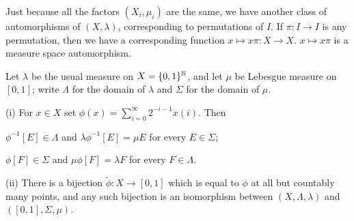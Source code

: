 
Just because all the factors $(X_i,\mu_i)$ are the same, we
have another class of automorphisms of $(X,\lambda)$, corresponding to
permutations of $I$.   If $\pi:I\to I$ is any permutation, then
we have a corresponding function $x\mapsto x\pi:X\to X$.    $x\mapsto x\pi$ is a measure
space automorphism.

 Let $\lambda$ be the usual measure on
$X=\{0,1\}^{\Bbb N}$, and let $\mu$ be Lebesgue measure on $[0,1]$;
write $\Lambda$ for the domain of $\lambda$ and $\Sigma$ for the domain
of $\mu$.

(i) For $x\in X$ set $\phi(x)=\sum_{i=0}^{\infty}2^{-i-1}x(i)$.   Then

\qquad $\phi^{-1}[E]\in\Lambda$ and $\lambda\phi^{-1}[E]=\mu E$
for every $E\in\Sigma$;

\qquad $\phi[F]\in\Sigma$ and $\mu\phi[F]=\lambda F$ for
every $F\in\Lambda$.

(ii) There is a bijection $\tilde\phi:X\to[0,1]$ which is equal to
$\phi$ at all but countably many points, and any such bijection is an
isomorphism between $(X,\Lambda,\lambda)$ and $([0,1],\Sigma,\mu)$.


